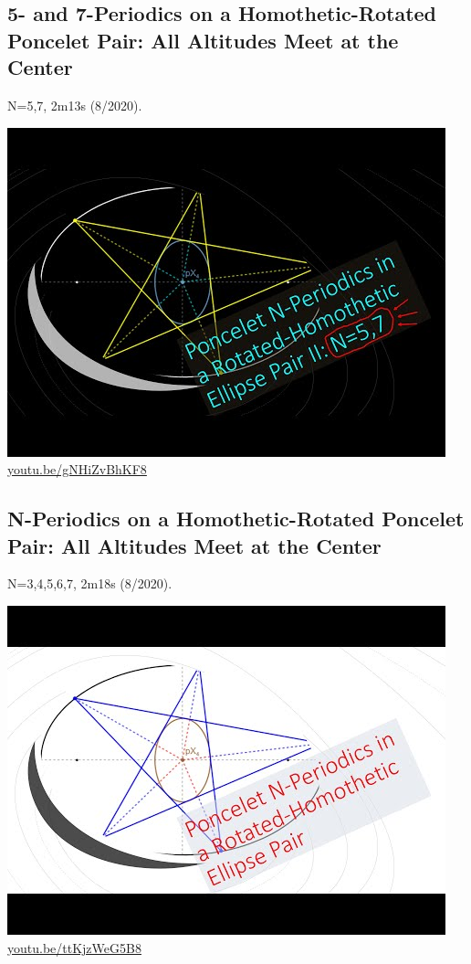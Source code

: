 \documentclass[12pt]{amsart}
\begin{document}
\subsection{5- and 7-Periodics on a Homothetic-Rotated Poncelet Pair: All Altitudes Meet at the Center}
\label{vid:gNHiZvBhKF8}
\noindent N=5,7, 2m13s (8/2020). 
\begin{center}\includegraphics[width=.5\textwidth]{pics/gNHiZvBhKF8.jpg} \\ 
\href{https://youtu.be/gNHiZvBhKF8}{\url{youtu.be/gNHiZvBhKF8}}\end{center}
% 
\subsection{N-Periodics on a Homothetic-Rotated Poncelet Pair: All Altitudes Meet at the Center}
\label{vid:ttKjzWeG5B8}
\noindent N=3,4,5,6,7, 2m18s (8/2020). 
\begin{center}\includegraphics[width=.5\textwidth]{pics/ttKjzWeG5B8.jpg} \\ 
\href{https://youtu.be/ttKjzWeG5B8}{\url{youtu.be/ttKjzWeG5B8}}\end{center}
% 
\end{document}

